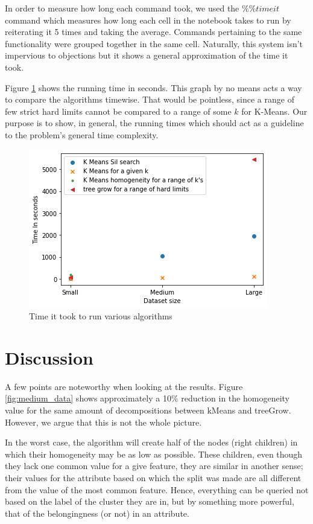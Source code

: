 \documentclass[sigconf]{acmart}
\begin{document}
In order to measure how long each command took, we used the $\%\%timeit$ command which measures how long each cell in the notebook takes to run by reiterating it 5 times and taking the average. Commands pertaining to the same functionality were grouped together in the same cell. Naturally, this system isn't impervious to objections but it shows a general approximation of the time it took.

Figure \ref{fig:TimeComp} shows the running time in seconds. This graph by no means acts a way to compare the algorithms timewise. That would be pointless, since a range of few strict hard limits cannot be compared to a range of some $k$ for K-Means. Our purpose is to show, in general, the running times which should act as a guideline to the problem's general time complexity. 
\begin{figure}[h!]
    \centering
    \includegraphics[scale=0.4]{images/TimesComparisons.png}
    \caption{Time it took to run various algorithms}
    \label{fig:TimeComp}
\end{figure}

\section{Discussion}
A few points are noteworthy when looking at the results. Figure \ref{fig:medium_data} shows approximately a 10\% reduction in the homogeneity value for the same amount of decompositions between kMeans and treeGrow. However, we argue that this is not the whole picture. 

In the worst case, the algorithm will create half of the nodes (right children) in which their homogeneity may be as low as possible. These children, even though they lack one common value for a give feature,  they are similar in another sense; their values for the attribute based on which the split was made are all different from the value of the most common feature. Hence, everything can be queried not based on the label of the cluster they are in, but by something more powerful, that of the belongingness (or not) in an attribute.
\end{document}
